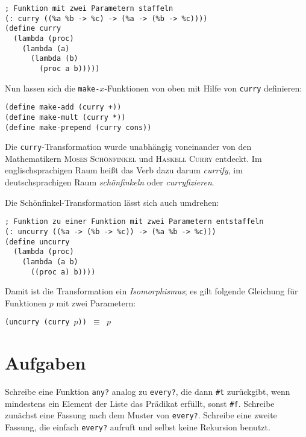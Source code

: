 %
\begin{lstlisting}
; Funktion mit zwei Parametern staffeln
(: curry ((%a %b -> %c) -> (%a -> (%b -> %c))))
(define curry
  (lambda (proc)
    (lambda (a)
      (lambda (b)
        (proc a b)))))
\end{lstlisting}
%
Nun lassen sich die \texttt{make-$x$}-Funktionen von oben mit Hilfe
von \texttt{curry} definieren:
%
\begin{lstlisting}
(define make-add (curry +))
(define make-mult (curry *))
(define make-prepend (curry cons))
\end{lstlisting}
%
Die \texttt{curry}-Transformation wurde unabhängig voneinander von den
Mathematikern \textsc{Moses Schönfinkel} und \textsc{Haskell Curry} entdeckt.  Im
englischsprachigen Raum heißt das Verb dazu darum  \textit{currify}, im deutschsprachigen Raum
\textit{schönfinkeln}
oder \textit{curryfizieren}.

Die Schönfinkel-Transformation lässt sich auch umdrehen:
%
\begin{lstlisting}
; Funktion zu einer Funktion mit zwei Parametern entstaffeln
(: uncurry ((%a -> (%b -> %c)) -> (%a %b -> %c)))
(define uncurry 
  (lambda (proc)
    (lambda (a b)
      ((proc a) b))))
\end{lstlisting}
%
Damit ist die Transformation ein \textit{Isomorphismus}; es gilt
folgende Gleichung für Funktionen $p$ mit zwei Parametern:\label{sec:curry-isomorphismus}
%
\begin{center}
  \texttt{(uncurry (curry \(p\))) \(\equiv\) \(p\)}
\end{center}

\section*{Aufgaben}

\begin{aufgabe}
  Schreibe eine Funktion \texttt{any?} analog zu 
  \texttt{every?}, die dann \verb|#t| zurückgibt, wenn mindestens ein 
  Element der Liste das Prädikat erfüllt, sonst \verb|#f|.  Schreibe 
  zunächst eine Fassung nach dem Muster von \texttt{every?}.  Schreibe
  eine zweite Fassung, die einfach \texttt{every?} aufruft und selbst keine
  Rekursion benutzt.
\end{aufgabe}

